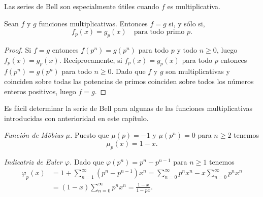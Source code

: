 \documentclass[12pt,a4paper]{book}
\begin{document}
    Las series de Bell son especialmente útiles cuando $f$ es multiplicativa.

    \begin{teorema}
        Sean $f$ y $g$ funciones multiplicativas. Entonces $f=g$ si, y sólo si,
        \begin{equation*}
            f_{p}(x)=g_{p}(x)\quad\text{para todo primo } p.
        \end{equation*}
    \end{teorema}

    \begin{proof}
        Si $f=g$ entonces $f(p^{n})=g(p^{n})$ para todo $p$ y todo $n\geq0$, luego
        $f_{p}(x)=g_{p}(x)$. Recíprocamente, si $f_{p}(x)=g_{p}(x)$ para todo $p$ entonces
        $f(p^{n})=g(p^{n})$ para todo $n\geq0$. Dado que $f$ y $g$ son multiplicativas y
        coinciden sobre todas las potencias de primos coinciden sobre todos los números
        enteros positivos, luego $f=g$.
    \end{proof}

    Es fácil determinar la serie de Bell para algunas de las funciones multiplicativas
    introducidas con anterioridad en este capítulo.

    \begin{ejemplo}
        \textit{Función de Möbius $\mu$.} Puesto que $\mu(p)=-1$ y $\mu(p^{n})=0$ para
        $n\geq2$ tenemos
        \begin{equation*}
            \mu_{p}(x)=1-x.
        \end{equation*}
    \end{ejemplo}

    \begin{ejemplo}
        \textit{Indicatriz de Euler $\varphi$.} Dado que $\varphi(p^{n})=p^{n}-p^{n-1}$ para
        $n\geq1$ tenemos
        \begin{align*}
            \varphi_{p}(x)&=1+\sum_{n=1}^{\infty}(p^{n}-p^{n-1})x^{n}
            =\sum_{n=0}^{\infty}p^{n}x^{n}-x\sum_{n=0}^{\infty}p^{n}x^{n}\\
            &=(1-x)\sum_{n=0}^{\infty}p^{n}x^{n}=\frac{1-x}{1-px}.
        \end{align*}
    \end{ejemplo}
\end{document}
